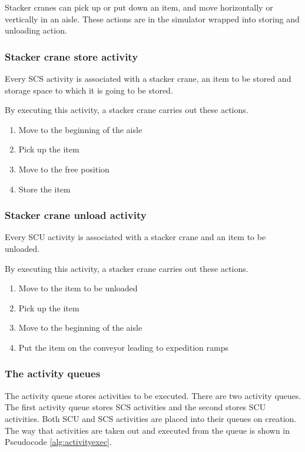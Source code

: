 \documentclass{ctuthesis}
\begin{document}
Stacker cranes can pick up or put down an item, and move horizontally or vertically in an aisle. These actions are in the simulator wrapped into storing and unloading action.

\subsubsection{Stacker crane store activity}

Every SCS activity is associated with a stacker crane, an item to be stored and storage space to which it is going to be stored.

By executing this activity, a stacker crane carries out these actions.

\begin{enumerate}
    \item Move to the beginning of the aisle
    \item Pick up the item
    \item Move to the free position
    \item Store the item
\end{enumerate}

\subsubsection{Stacker crane unload activity}

Every SCU activity is associated with a stacker crane and an item to be unloaded.

By executing this activity, a stacker crane carries out these actions.

\begin{enumerate}
    \item Move to the item to be unloaded
    \item Pick up the item
    \item Move to the beginning of the aisle
    \item Put the item on the conveyor leading to expedition ramps
\end{enumerate}

\subsubsection{The activity queues}
\label{subsec:activityqueue}

 The activity queue stores activities to be executed. There are two activity queues. The first activity queue stores SCS activities and the second stores SCU activities. Both SCU and SCS activities are placed into their queues on creation. The way that activities are taken out and executed from the queue is shown in Pseudocode \ref{alg:activityexec}.
\end{document}

